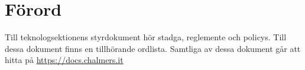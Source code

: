 \section*{Förord}
Till teknologsektionens styrdokument hör stadga, reglemente och policys. 
Till dessa dokument finns en tillhörande ordlista. 
Samtliga av dessa dokument går att hitta på \url{https://docs.chalmers.it} 
